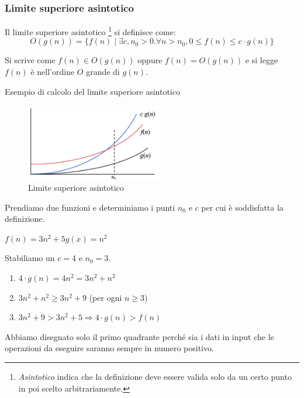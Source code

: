 \subsubsection{Limite superiore asintotico}
\begin{definition}
	Il limite superiore asintotico \footnote{\emph{Asintotico} indica che la definizione deve essere valida solo da un certo punto in poi scelto arbitrariamente.} si definisce come:
	\begin{equation}
		O(g(n)) = \{f(n) \mid \exists c, n_0 > 0 . \forall n > n_0, 0 \leq f(n) \leq c \cdot g(n)\}
	\end{equation}
\end{definition}
\noindent Si scrive come $f(n) \in O(g(n))$ oppure $f(n) = O(g(n))$ e si legge $f(n)$ è nell'ordine $O$ grande di $g(n)$.
\begin{example}
	Esempio di calcolo del limite superiore asintotico
\end{example}
\begin{figure}
	\vspace{-15pt}
	\centering
	\includegraphics[width=6cm]{images/limite-superiore-asintotico.png}
	\vspace{-5pt}
	\caption{Limite superiore asintotico}
\end{figure}
Prendiamo due funzioni e determiniamo i punti $n_0$ e $c$ per cui è soddisfatta la definizione.
\begin{center}
	\vspace{-5pt}
	$f(n) = 3n^2 + 5$\hspace{30pt}$g(x)=n^2$
\end{center}
Stabiliamo un $c = 4$ e $n_0 = 3$.
\begin{enumerate}
	\item $4 \cdot g(n) = 4n^2 = 3n^2 + n^2 $
	\item $3n^2 + n^2 \geq 3n^2 + 9 $ (per ogni $n \geq 3$)
	\item $3n^2 + 9 > 3n^2+5 \Longrightarrow 4 \cdot g(n) > f(n)$
\end{enumerate}

\begin{note}
	Abbiamo disegnato solo il primo quadrante perché sia i dati in input che le operazioni da eseguire saranno sempre in numero positivo.
\end{note}

